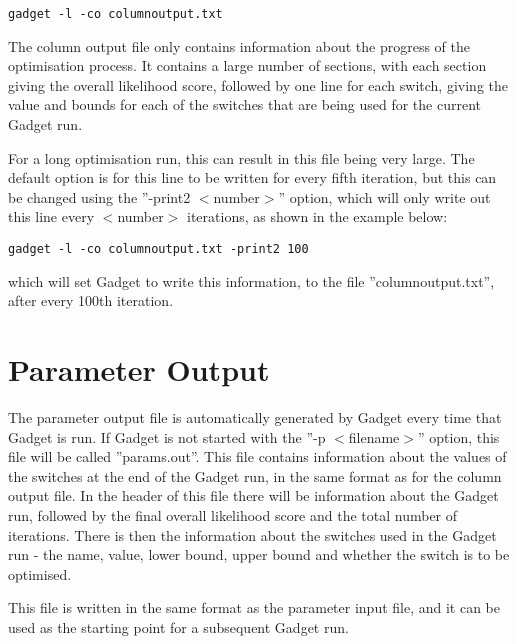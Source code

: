 \documentclass [a4paper, 10pt]{book}
\begin{document}
{\small\begin{verbatim}
gadget -l -co columnoutput.txt
\end{verbatim}}

The column output file only contains information about the progress of the optimisation process.  It contains a large number of sections, with each section giving the overall likelihood score, followed by one line for each switch, giving the value and bounds for each of the switches that are being used for the current Gadget run.

\bigskip
For a long optimisation run, this can result in this file being very large.  The default option is for this line to be written for every fifth iteration, but this can be changed using the ''-print2 $<$number$>$'' option, which will only write out this line every $<$number$>$ iterations, as shown in the example below:

{\small\begin{verbatim}
gadget -l -co columnoutput.txt -print2 100
\end{verbatim}}

which will set Gadget to write this information, to the file ''columnoutput.txt'', after every 100th iteration.

\section{Parameter Output}\label{sec:paramoutput}
The parameter output file is automatically generated by Gadget every time that Gadget is run.  If Gadget is not started with the ''-p $<$filename$>$'' option, this file will be called ''params.out''.  This file contains information about the values of the switches at the end of the Gadget run, in the same format as for the column output file.  In the header of this file there will be information about the Gadget run, followed by the final overall likelihood score and the total number of iterations.  There is then the information about the switches used in the Gadget run - the name, value, lower bound, upper bound and whether the switch is to be optimised.

\bigskip
This file is written in the same format as the parameter input file, and it can be used as the starting point for a subsequent Gadget run.
\end{document}
